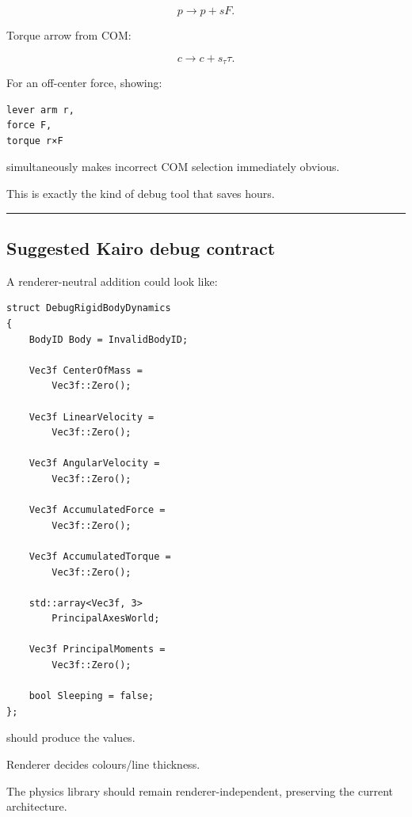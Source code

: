 \[
p\rightarrow p+sF.
\]

Torque arrow from COM:

\[
c\rightarrow c+s_\tau\tau.
\]

For an off-center force, showing:

\begin{verbatim}
lever arm r,
force F,
torque r×F
\end{verbatim}

simultaneously makes incorrect COM selection immediately obvious.

This is exactly the kind of debug tool that saves hours.

\begin{center}\rule{0.5\linewidth}{0.5pt}\end{center}

\subsection{Suggested Kairo debug contract}\label{06-engine-ii-ch039-suggested-kairo-debug-contract}

\hypertarget{06-engine-ii-ch039-suggested-kairo-debug-contract}{}

A renderer-neutral addition could look like:

\begin{verbatim}
struct DebugRigidBodyDynamics
{
    BodyID Body = InvalidBodyID;

    Vec3f CenterOfMass =
        Vec3f::Zero();

    Vec3f LinearVelocity =
        Vec3f::Zero();

    Vec3f AngularVelocity =
        Vec3f::Zero();

    Vec3f AccumulatedForce =
        Vec3f::Zero();

    Vec3f AccumulatedTorque =
        Vec3f::Zero();

    std::array<Vec3f, 3>
        PrincipalAxesWorld;

    Vec3f PrincipalMoments =
        Vec3f::Zero();

    bool Sleeping = false;
};
\end{verbatim}

 should produce the values.

Renderer decides colours/line thickness.

The physics library should remain renderer-independent, preserving the current architecture.

